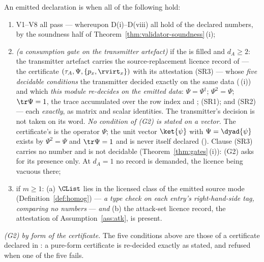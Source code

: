 \begin{definition}\label{def:eligible}
An emitted declaration is 
when all of the following hold:
\begin{enumerate}[label=(G\arabic*),leftmargin=3.0em]
\item V1--V8 all pass --- whereupon D(i)--D(viii) all hold of the declared
numbers, by the soundness half of Theorem~\ref{thm:validator-soundness}\,(i);
\item \emph{(a consumption gate on the transmitter artefact)} if the
 is filled and $d_A\ge2$: the transmitter artefact
carries the source-replacement licence record of
 --- the certificate
$(\tau_A,\Psi,\{p_x,\rvirt_x\})$ with its attestation (SR3) --- whose
\emph{five decidable conditions} the transmitter decided exactly on the same
data (\,(i)) and which \emph{this
module re-decides on the emitted data}: $\Psi=\Psi^{\dagger}$; $\Psi^2=\Psi$;
$\tr\Psi=1$, the trace accumulated over the row index and
; (SR1); and (SR2) --- each
\emph{exactly}, as matrix and scalar identities. The transmitter's decision is
not taken on its word. \emph{No condition of (G2) is stated on
a vector.} The certificate's  is the operator $\Psi$; the unit
vector $\ket{\psi}$ with $\Psi=\dyad{\psi}$ exists by $\Psi^2=\Psi$ and
$\tr\Psi=1$ and is never itself declared ().
Clause (SR3) carries no number and is not decidable
(Theorem~\ref{thm:gates}\,(i)): (G2) asks for its presence only. At $d_A=1$
no record is demanded, the licence being vacuous there;
\item if $m\ge1$: (a) $\CList$ lies in the licensed class of the emitted source
mode (Definition~\ref{def:homog}) --- \emph{a type check on each entry's
right-hand-side tag, comparing no numbers} --- \emph{and}
(b) the attack-set licence record, the attestation of
Assumption~\ref{ass:atk}, is present.
\end{enumerate}

\emph{(G2) by form of the certificate.} The five conditions above are those
of a certificate declared in : a pure-form certificate is
re-decided exactly as stated, and refused when one of the five fails.


\end{definition}
